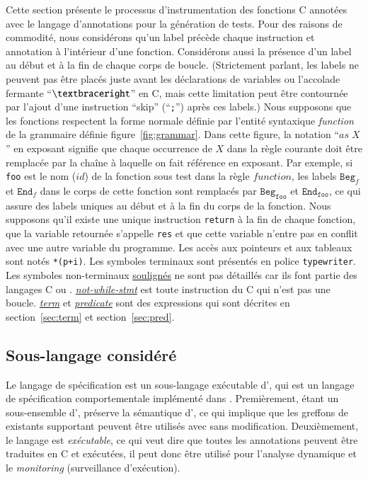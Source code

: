 Cette section présente le processus d'instrumentation des fonctions C annotées
avec le langage d'annotations \eacsl pour la génération de tests.
Pour des raisons de commodité, nous considérons qu'un label précède chaque
instruction et annotation à l'intérieur d'une fonction.
Considérons aussi la présence d'un label au début et à la fin de chaque corps de
boucle.
(Strictement parlant, les labels ne peuvent pas être placés juste avant les
déclarations de variables ou l'accolade fermante ``$\bclose$'' en C, mais
cette limitation peut être contournée par l'ajout d'une instruction ``skip''
(``\lstinline{;}'') après ces labels.)
Nous supposons que les fonctions respectent la forme normale définie par
l'entité syntaxique \textit{function} de la grammaire définie
figure~\ref{fig:grammar}. 
Dans cette figure, la notation ``${\textit{as}\;X}$'' en exposant signifie que
chaque occurrence de $X$ dans la règle courante doit être remplacée par la
chaîne à laquelle on fait référence en exposant.
Par exemple, si \texttt{foo} est le nom ($id$) de la fonction sous test dans la
règle $function$, les labels $\texttt{Beg}_f$ et $\texttt{End}_f$ dans le corps
de cette fonction sont remplacés par $\texttt{Beg}_{\texttt{foo}}$ et
$\texttt{End}_{\texttt{foo}}$, ce qui assure des labels uniques au début et à la
fin du corps de la fonction.
Nous supposons qu'il existe une unique instruction \lstinline'return' à la fin
de chaque fonction, que la variable retournée s'appelle \lstinline'res' et que
cette variable n'entre pas en conflit avec une autre variable du programme.
Les accès aux pointeurs et aux tableaux sont notés \lstinline|*(p+i)|.
Les symboles terminaux sont présentés en police \texttt{typewriter}.
Les symboles non-terminaux \underline{soulignés} ne sont pas détaillés car ils
font partie des langages C ou \eacsl.
\textit{\underline{not-while-stmt}} est toute instruction du C qui n'est pas
une boucle.
\textit{\underline{term}} et \textit{\underline{predicate}} sont des expressions
\eacsl qui sont décrites en section~\ref{sec:term} et section~\ref{sec:pred}.


\subsection{Sous-langage considéré}

Le langage de spécification \eacsl est un sous-langage exécutable d'\acsl, qui
est un langage de spécification comportementale implémenté dans \framac.
Premièrement, étant un sous-ensemble d'\acsl, \eacsl préserve la sémantique
d'\acsl, ce qui implique que les greffons de \framac existants supportant \acsl
peuvent être utilisés avec \eacsl sans modification.
Deuxièmement, le langage \eacsl est \textit{exécutable}, ce qui veut dire que
toutes les annotations peuvent être traduites en C et exécutées, il peut donc
être utilisé pour l'analyse dynamique et le \textit{monitoring} (surveillance
d'exécution).

